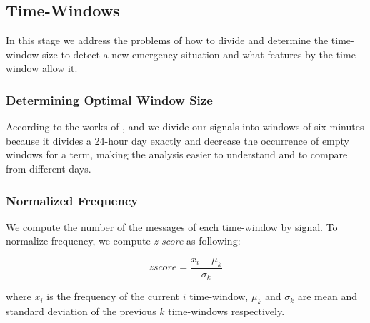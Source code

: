 \documentclass{llncs}
\begin{document}
\subsection{Time-Windows}
In this stage we address the problems of how to divide and determine the time-window size to detect a new emergency situation and what features by the time-window allow it.

\subsubsection{Determining Optimal Window Size}

According to the works of \citeauthor{guzman2013line}, and \citeauthor{maldonado2017} \cite{guzman2013line,maldonado2017} we divide our signals into windows of six minutes because it divides a 24-hour day exactly and decrease the occurrence of empty windows for a term, making the analysis easier to understand and to compare from different days.


\subsubsection{Normalized Frequency}
We compute the number of the messages of each time-window by signal. To normalize frequency, we compute \textit{z-score} as following:

\begin{equation} \label{eq:1}
zscore = \frac{x_{i} - \mu_{k} }{\sigma_{k}}
\end{equation}

where $x_{i}$ is the frequency of the current $i$ time-window, $\mu_{k}$ and  $\sigma_{k}$ are mean and standard deviation of the previous $k$ time-windows respectively.

\end{document}
